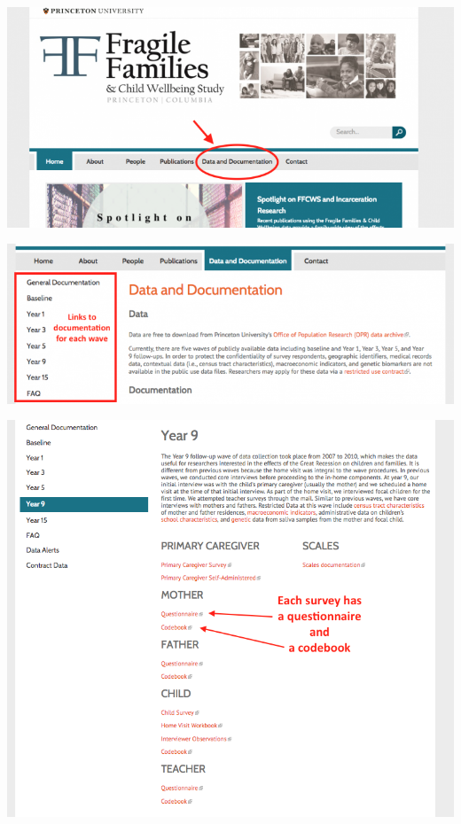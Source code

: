 \documentclass{beamer}
\begin{document}
\begin{frame}

\centering\includegraphics[width = .8\textwidth]{figures/Doc1}

\end{frame}
\begin{frame}

\centering\includegraphics[width = .8\textwidth]{figures/Doc2}

\end{frame}
\begin{frame}

\centering\includegraphics[width = .8\textwidth]{figures/Doc3}

\end{frame}
\end{document}
